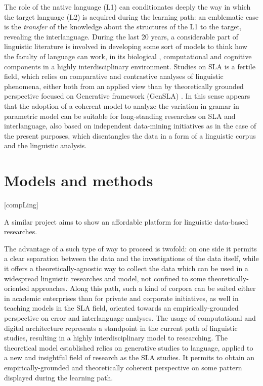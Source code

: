 \documentclass[a4paper,twoside,11pt,chapterprefix=false,bibliography=totocnumbered]{scrbook}
\theoremstyle{definition}
\theoremstyle{definition}
\theoremstyle{definition}
\theoremstyle{remark}
\begin{document}
The role of the native language (L1) can conditionates deeply the way in
which the target language (L2) is acquired during the learning path: an
emblematic case is the \emph{transfer} of the knowledge about the
structures of the L1 to the target, revealing the interlanguage. During
the last 20 years, a considerable part of linguistic literature is
involved in developing some sort of models to think how the faculty of
language can work, in its biological \citep{hcf2002}, computational
\citep{fodor2001} and cognitive components in a highly interdisciplinary
environment. Studies on SLA is a fertile field, which relies on
comparative and contrastive analyses of linguistic phenomena, either
both from an applied view \citep{ellis_study_101} than by theoretically
grounded perspective focused on Generative framework (GenSLA)
\citep[\citet{rothman_slabakova_2017}, \citet{hawkins2001},
\citet{sorace2011pinning}]{guasti2002}. In this sense appears that the
adoption of a coherent model to analyze the variation in gramar in
parametric model can be suitable for long-standing researches on SLA and
interlanguage, also based on independent data-mining initiatives as in
the case of the present purposes, which disentangles the data in a form
of a linguistic corpus and the linguistic analysis.

\section{Models and methods}\label{models-and-methods}

{[}compLing{]}

A similar project aims to show an affordable platform for linguistic
data-based researches.

The advantage of a such type of way to proceed is twofold: on one side
it permits a clear separation between the data and the investigations of
the data itself, while it offers a theoretically-agnostic way to collect
the data which can be used in a widespread linguistic researches and
model, not confined to some theoretically-oriented approaches. Along
this path, such a kind of corpora can be suited either in academic
enterprises than for private and corporate initiatives, as well in
teaching models in the SLA field, oriented towards an
empirically-grounded perspective on error and interlanguage analyses.
The usage of computational and digital architecture
\citep[\citet{kurdi_natural_2016-2},
\citet{kuebler-corpus_linguistics}]{clark_handbook_2010-1} represents a
standpoint in the current path of linguistic studies, resulting in a
highly interdisciplinary model to researching. The theoretical model
established relies on generative studies to language, applied to a new
and insightful field of research as the SLA studies. It permits to
obtain an empirically-grounded and theoretically coherent perspective on
some pattern displayed during the learning path.
\end{document}
